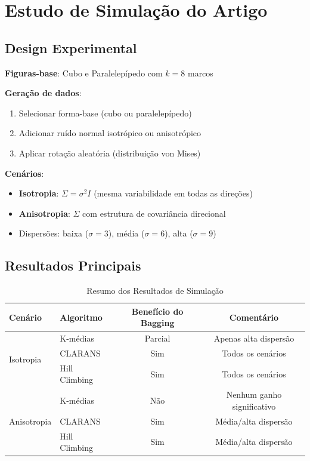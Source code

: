 \documentclass[12pt,a4paper]{article}
\theoremstyle{definition}
\begin{document}
\section{Estudo de Simulação do Artigo}

\subsection{Design Experimental}

\begin{tcolorbox}[caixaalgoritmo={Cenários Simulados}]
\textbf{Figuras-base}: Cubo e Paralelepípedo com $k=8$ marcos

\textbf{Geração de dados}:
\begin{enumerate}
    \item Selecionar forma-base (cubo ou paralelepípedo)
    \item Adicionar ruído normal isotrópico ou anisotrópico
    \item Aplicar rotação aleatória (distribuição von Mises)
\end{enumerate}

\textbf{Cenários}:
\begin{itemize}
    \item \textbf{Isotropia}: $\Sigma = \sigma^2 I$ (mesma variabilidade em todas as direções)
    \item \textbf{Anisotropia}: $\Sigma$ com estrutura de covariância direcional
    \item Dispersões: baixa ($\sigma=3$), média ($\sigma=6$), alta ($\sigma=9$)
\end{itemize}
\end{tcolorbox}

\subsection{Resultados Principais}

\begin{table}[h]
\centering
\caption{Resumo dos Resultados de Simulação}
\begin{tabular}{llcc}
\toprule
Cenário & Algoritmo & Benefício do Bagging & Comentário \\
\midrule
\multirow{3}{*}{Isotropia} 
& K-médias & Parcial & Apenas alta dispersão \\
& CLARANS & Sim & Todos os cenários \\
& Hill Climbing & Sim & Todos os cenários \\
\midrule
\multirow{3}{*}{Anisotropia} 
& K-médias & Não & Nenhum ganho significativo \\
& CLARANS & Sim & Média/alta dispersão \\
& Hill Climbing & Sim & Média/alta dispersão \\
\bottomrule
\end{tabular}
\end{table}
\end{document}
